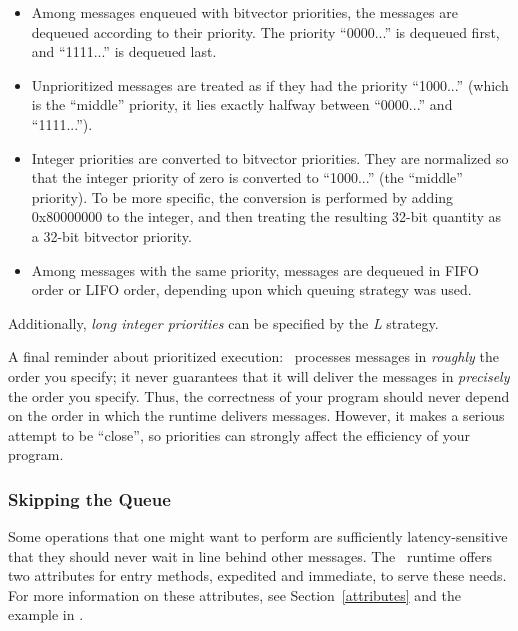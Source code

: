 \begin{itemize}

\item Among messages enqueued with bitvector priorities, the messages are
  dequeued according to their priority.  The priority ``0000...'' is dequeued
  first, and ``1111...'' is dequeued last.

\item Unprioritized messages are treated as if they had the priority
  ``1000...'' (which is the ``middle'' priority, it lies exactly halfway
  between ``0000...'' and ``1111...'').

\item Integer priorities are converted to bitvector priorities.  They are
  normalized so that the integer priority of zero is converted to ``1000...''
  (the ``middle'' priority).  To be more specific, the conversion is performed
  by adding 0x80000000 to the integer, and then treating the resulting 32-bit
  quantity as a 32-bit bitvector priority.

\item Among messages with the same priority, messages are dequeued in FIFO
  order or LIFO order, depending upon which queuing strategy was used.

\end{itemize}

Additionally, {\sl long integer priorities} can be specified by the {\em L}
strategy.

A final reminder about prioritized execution: \charmpp\ processes messages in
{\it roughly} the order you specify; it never guarantees that it will deliver
the messages in {\it precisely} the order you
specify. Thus, the correctness of your program should never depend on the order
in which the runtime delivers messages. However, it makes a serious attempt to
be ``close'', so priorities can strongly affect the efficiency of your program.

\subsubsection{Skipping the Queue}

Some operations that one might want to perform are sufficiently
latency-sensitive that they should never wait in line behind other
messages. The \charmpp\ runtime offers two attributes for entry
methods, {\kw expedited} and {\kw immediate}, to serve these
needs. For more information on these attributes, see
Section~\ref{attributes} and the example in
  .
